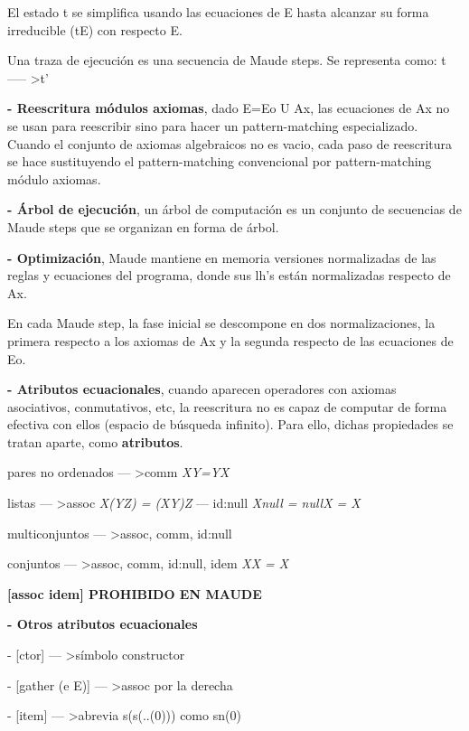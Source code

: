 \documentclass[12pt]{amsart}
\begin{document}
    El estado t se simplifica usando las ecuaciones de E hasta
    alcanzar su forma irreducible (tE) con respecto E.

    Una traza de ejecución es una secuencia de Maude steps.
    Se representa como: t ----- \textgreater t'

    \textbf{- Reescritura módulos axiomas}, dado E=Eo U Ax,
    las ecuaciones de Ax no se usan para reescribir sino
    para hacer un pattern-matching especializado. Cuando el
    conjunto de axiomas algebraicos no es vacio, cada paso
    de reescritura se hace sustituyendo el pattern-matching
    convencional por pattern-matching módulo axiomas.

    \textbf{- Árbol de ejecución}, un árbol de computación
    es un conjunto de secuencias de Maude steps que se organizan en
    forma de árbol.

    \textbf{- Optimización}, Maude mantiene en memoria versiones
    normalizadas de las reglas y ecuaciones del programa, donde sus
    lh's están normalizadas respecto de Ax. 
    
    En cada Maude step, la fase inicial se descompone en dos normalizaciones,
    la primera respecto a los axiomas de Ax y la segunda respecto de
    las ecuaciones de Eo.

    \textbf{- Atributos ecuacionales}, cuando aparecen operadores con
    axiomas asociativos, conmutativos, etc, la reescritura no es capaz
    de computar de forma efectiva con ellos (espacio de búsqueda
    infinito). Para ello, dichas propiedades se tratan aparte, como
    \textbf{atributos}.

    \medskip

    pares no ordenados --- \textgreater comm \emph{XY=YX}

    listas --- \textgreater assoc \emph{X(YZ) = (XY)Z} --- id:null 
    \emph{Xnull = nullX = X}

    multiconjuntos --- \textgreater assoc, comm, id:null

    conjuntos --- \textgreater assoc, comm, id:null, idem \emph{XX = X}
    
    \textbf{[assoc idem] PROHIBIDO EN MAUDE}

    \medskip

    \textbf{- Otros atributos ecuacionales}

    - [ctor] --- \textgreater símbolo constructor
    
    - [gather (e E)] --- \textgreater assoc por la derecha

    - [item] --- \textgreater abrevia s(s(..(0))) como sn(0)
\end{document}
